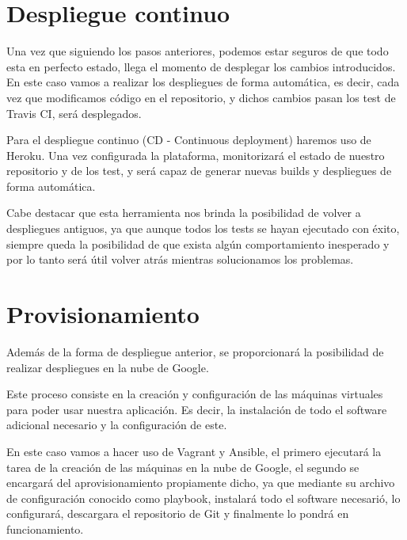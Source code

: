 \section {Despliegue continuo}
Una vez que siguiendo los pasos anteriores, podemos estar seguros de que todo esta en perfecto estado, llega el momento de desplegar los cambios introducidos.
En este caso vamos a realizar los despliegues de forma automática, es decir, cada vez que modificamos código en el repositorio, y dichos cambios pasan los test de Travis CI, será desplegados.

Para el despliegue continuo  (CD - Continuous deployment) haremos uso de Heroku. Una vez configurada la plataforma, monitorizará el estado de nuestro repositorio y de los test, y será capaz de generar nuevas builds y despliegues de forma automática.

Cabe destacar que esta herramienta nos brinda la posibilidad de volver a despliegues antiguos, ya que aunque todos los tests se hayan ejecutado con éxito, siempre queda la posibilidad de que exista algún comportamiento inesperado y por lo tanto será útil volver atrás mientras solucionamos los problemas.

\section {Provisionamiento}

Además de la forma de despliegue anterior, se proporcionará la posibilidad de realizar despliegues en la nube de Google.

Este proceso consiste en la creación y configuración de las máquinas virtuales para poder usar nuestra aplicación. Es decir, la instalación de todo el software adicional necesario y la configuración de este.

En este caso vamos a hacer uso de Vagrant y Ansible, el primero ejecutará la tarea de la creación de las máquinas en la nube de Google, el segundo se encargará del aprovisionamiento propiamente dicho, ya que mediante su archivo de configuración conocido como playbook, instalará todo el software necesarió, lo configurará, descargara el repositorio de Git y finalmente lo pondrá en funcionamiento.











